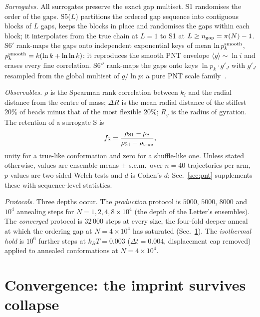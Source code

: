\documentclass[reprint,amsmath,amssymb,aps,pre,longbibliography]{revtex4-2}
\begin{document}
\emph{Surrogates.} All surrogates preserve the exact gap multiset. S1 randomises the order
of the gaps. S5($L$) partitions the ordered gap sequence into contiguous blocks of $L$ gaps,
keeps the blocks in place and randomises the gaps within each block; it interpolates from the
true chain at $L=1$ to S1 at $L\ge n_{\rm gap}=\pi(N)-1$. S6$'$ rank-maps the gaps onto
independent exponential keys of mean $\ln p_k^{\rm smooth}$,
$p_k^{\rm smooth}=k(\ln k+\ln\ln k)$: it reproduces the smooth PNT envelope
$\langle g\rangle\sim\ln i$ and erases every fine correlation. S6$''$ rank-maps the gaps onto
keys $\ln p_k\cdot g'_J$ with $g'_J$ resampled from the global multiset of $g/\ln p$: a pure
PNT scale family~\cite{PDTP4}.

\emph{Observables.} $\rho$ is the Spearman rank correlation between $k_i$ and the radial
distance from the centre of mass; $\Delta R$ is the mean radial distance of the stiffest
$20\%$ of beads minus that of the most flexible $20\%$; $R_g$ is the radius of gyration. The
retention of a surrogate S is
\begin{equation}
f_{\rm S}=\frac{\rho_{\rm S1}-\rho_{\rm S}}{\rho_{\rm S1}-\rho_{\rm true}},
\label{eq:retention}
\end{equation}
unity for a true-like conformation and zero for a shuffle-like one. Unless stated otherwise,
values are ensemble means $\pm$ s.e.m.\ over $n=40$ trajectories per arm, $p$-values are
two-sided Welch tests and $d$ is Cohen's $d$; Sec.~\ref{sec:pnt} supplements these with
sequence-level statistics.

\emph{Protocols.} Three depths occur. The \emph{production} protocol is $5000$, $5000$,
$8000$ and $10^{4}$ annealing steps for $N=1,2,4,8\times10^{4}$ (the depth of the Letter's
ensembles). The \emph{converged} protocol is $32\,000$ steps at every size, the four-fold
deeper anneal at which the ordering gap at $N=4\times10^{4}$ has saturated
(Sec.~\ref{sec:conv}). The \emph{isothermal hold} is $10^{6}$ further steps at $k_BT=0.003$
($\Delta t=0.004$, displacement cap removed) applied to annealed conformations at
$N=4\times10^{4}$.

\section{Convergence: the imprint survives collapse}\label{sec:conv}
\end{document}
